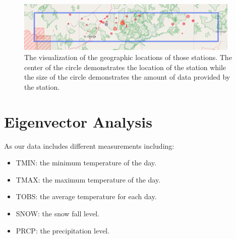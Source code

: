 \documentclass[a4paper]{article}
\begin{document}
\begin{figure}[!htp]
\centering
\includegraphics[width=0.95\textwidth]{geo-loc.png}
\caption{\label{fig:geo-loc} The visualization of the geographic locations of those stations. The center of the circle demonstrates the location of the station while the size of the circle demonstrates the amount of data provided by the station.}
\end{figure}

\section{Eigenvector Analysis}
As our data includes different measurements including:
\begin{itemize}
\item TMIN: the minimum temperature of the day.
\item TMAX: the maximum temperature of the day.
\item TOBS: the average temperature for each day. 
\item SNOW: the snow fall level.
\item PRCP: the precipitation level.
\end{itemize}
\end{document}
